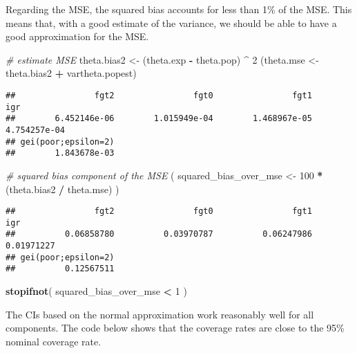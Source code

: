 \documentclass[
]{book}
\newenvironment{Shaded}{\begin{snugshade}}{\end{snugshade}}
\newcommand{\CommentTok}[1]{\textcolor[rgb]{0.56,0.35,0.01}{\textit{#1}}}
\newcommand{\DecValTok}[1]{\textcolor[rgb]{0.00,0.00,0.81}{#1}}
\newcommand{\FunctionTok}[1]{\textcolor[rgb]{0.13,0.29,0.53}{\textbf{#1}}}
\newcommand{\NormalTok}[1]{#1}
\newcommand{\OtherTok}[1]{\textcolor[rgb]{0.56,0.35,0.01}{#1}}
\newcommand{\SpecialCharTok}[1]{\textcolor[rgb]{0.81,0.36,0.00}{\textbf{#1}}}
\begin{document}
Regarding the MSE, the squared bias accounts for less than 1\% of the MSE.
This means that, with a good estimate of the variance, we should be able to have a good approximation for the MSE.

\begin{Shaded}
\begin{Highlighting}[]
\CommentTok{\# estimate MSE}
\NormalTok{theta.bias2 }\OtherTok{\textless{}{-}}\NormalTok{ (theta.exp }\SpecialCharTok{{-}}\NormalTok{ theta.pop) }\SpecialCharTok{\^{}} \DecValTok{2}
\NormalTok{(theta.mse }\OtherTok{\textless{}{-}}\NormalTok{ theta.bias2 }\SpecialCharTok{+}\NormalTok{ vartheta.popest)}
\end{Highlighting}
\end{Shaded}

\begin{verbatim}
##                fgt2                fgt0                fgt1                 igr 
##        6.452146e-06        1.015949e-04        1.468967e-05        4.754257e-04 
## gei(poor;epsilon=2) 
##        1.843678e-03
\end{verbatim}

\begin{Shaded}
\begin{Highlighting}[]
\CommentTok{\# squared bias component of the MSE}
\NormalTok{( squared\_bias\_over\_mse }\OtherTok{\textless{}{-}} \DecValTok{100} \SpecialCharTok{*}\NormalTok{ (theta.bias2 }\SpecialCharTok{/}\NormalTok{ theta.mse) )}
\end{Highlighting}
\end{Shaded}

\begin{verbatim}
##                fgt2                fgt0                fgt1                 igr 
##          0.06858780          0.03970787          0.06247986          0.01971227 
## gei(poor;epsilon=2) 
##          0.12567511
\end{verbatim}

\begin{Shaded}
\begin{Highlighting}[]
\FunctionTok{stopifnot}\NormalTok{( squared\_bias\_over\_mse }\SpecialCharTok{\textless{}} \DecValTok{1}\NormalTok{ )}
\end{Highlighting}
\end{Shaded}

The CIs based on the normal approximation work reasonably well for all components. The code below shows that the coverage rates are close to the 95\% nominal coverage rate.
\end{document}
